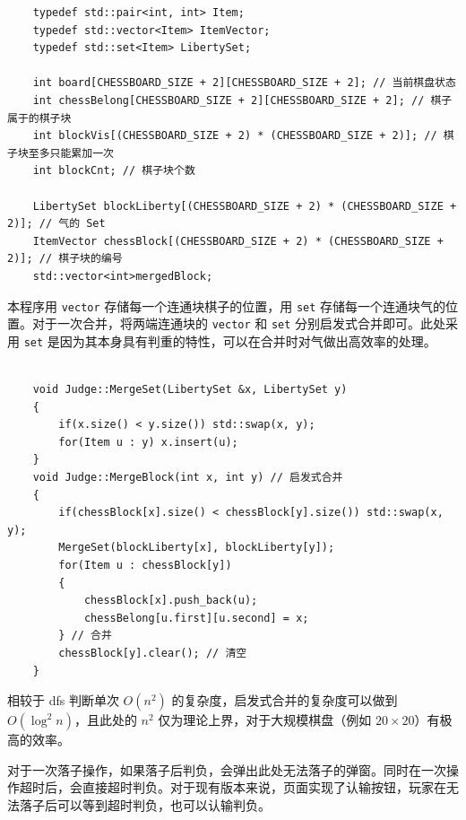 \documentclass{noithesis}
\begin{document}
	\begin{lstlisting}
	typedef std::pair<int, int> Item;
	typedef std::vector<Item> ItemVector;
	typedef std::set<Item> LibertySet;

	int board[CHESSBOARD_SIZE + 2][CHESSBOARD_SIZE + 2]; // 当前棋盘状态
	int chessBelong[CHESSBOARD_SIZE + 2][CHESSBOARD_SIZE + 2]; // 棋子属于的棋子块
	int blockVis[(CHESSBOARD_SIZE + 2) * (CHESSBOARD_SIZE + 2)]; // 棋子块至多只能累加一次
	int blockCnt; // 棋子块个数
	
	LibertySet blockLiberty[(CHESSBOARD_SIZE + 2) * (CHESSBOARD_SIZE + 2)]; // 气的 Set
	ItemVector chessBlock[(CHESSBOARD_SIZE + 2) * (CHESSBOARD_SIZE + 2)]; // 棋子块的编号
	std::vector<int>mergedBlock;
	\end{lstlisting}

	本程序用 \verb|vector| 存储每一个连通块棋子的位置，用 \verb|set| 存储每一个连通块气的位置。对于一次合并，将两端连通块的 \verb|vector| 和 \verb|set| 分别启发式合并即可。此处采用 \verb|set| 是因为其本身具有判重的特性，可以在合并时对气做出高效率的处理。
	
	\begin{lstlisting}
		
	void Judge::MergeSet(LibertySet &x, LibertySet y)
	{
		if(x.size() < y.size()) std::swap(x, y);
		for(Item u : y) x.insert(u);
	}
	void Judge::MergeBlock(int x, int y) // 启发式合并
	{
		if(chessBlock[x].size() < chessBlock[y].size()) std::swap(x, y);
		MergeSet(blockLiberty[x], blockLiberty[y]);
		for(Item u : chessBlock[y])
		{
			chessBlock[x].push_back(u);
			chessBelong[u.first][u.second] = x;
		} // 合并
		chessBlock[y].clear(); // 清空
	}
	\end{lstlisting}

	相较于 dfs 判断单次 $O\left(n^2\right)$ 的复杂度，启发式合并的复杂度可以做到 $O\left(\log^2 n\right)$，且此处的 $n^2$ 仅为理论上界，对于大规模棋盘（例如 $20\times 20$）有极高的效率。
	
	对于一次落子操作，如果落子后判负，会弹出此处无法落子的弹窗。同时在一次操作超时后，会直接超时判负。对于现有版本来说，页面实现了认输按钮，玩家在无法落子后可以等到超时判负，也可以认输判负。
	
\end{document}
